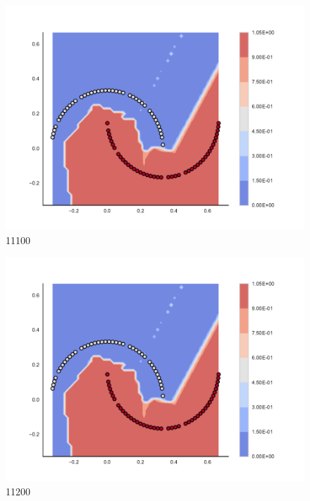 \begin{subfigure}[b]{0.09\textwidth}
    \includegraphics[clip, trim=2.35cm 1.75cm 4.5cm 0cm,width=\textwidth]{img/convergence/11100.pdf}
    \caption{11100}
    \label{fig:convergence_11100}
\end{subfigure}
%
\begin{subfigure}[b]{0.09\textwidth}
    \includegraphics[clip, trim=2.35cm 1.75cm 4.5cm 0cm,width=\textwidth]{img/convergence/11200.pdf}
    \caption{11200}
    \label{fig:convergence_11200}
\end{subfigure}
%
